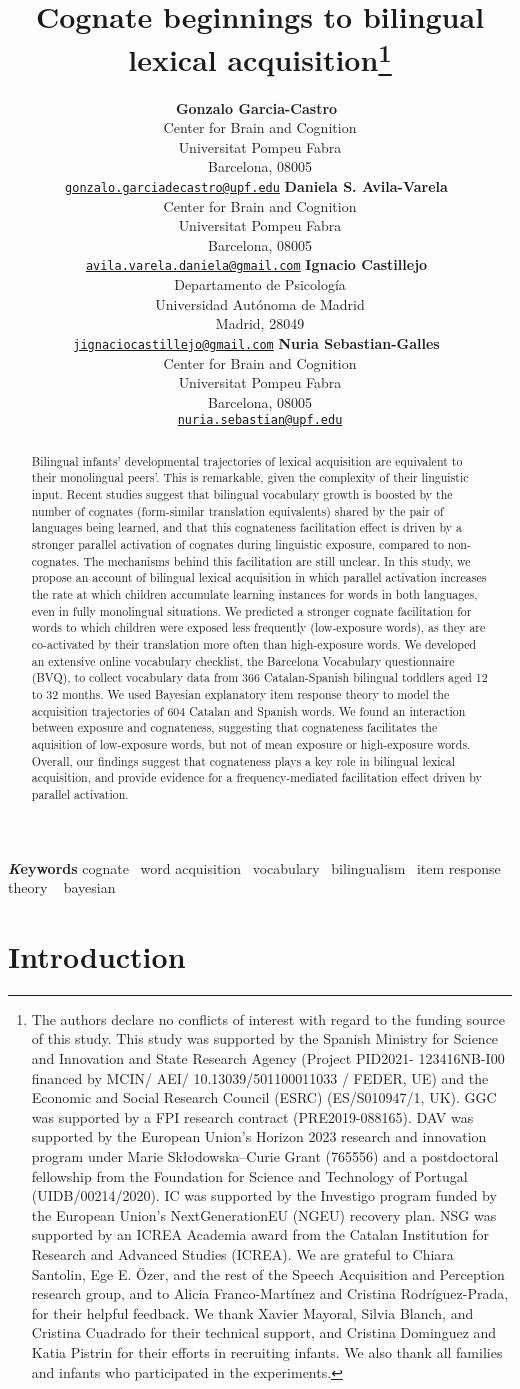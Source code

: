 \documentclass[
]{article}
\title{Cognate beginnings to bilingual lexical acquisition\thanks{The
authors declare no conflicts of interest with regard to the funding
source of this study. This study was supported by the Spanish Ministry
for Science and Innovation and State Research Agency (Project PID2021-
123416NB-I00 financed by MCIN/ AEI/ 10.13039/501100011033 / FEDER, UE)
and the Economic and Social Research Council (ESRC) (ES/S010947/1, UK).
GGC was supported by a FPI research contract (PRE2019-088165). DAV was
supported by the European Union's Horizon 2023 research and innovation
program under Marie Skłodowska--Curie Grant (765556) and a postdoctoral
fellowship from the Foundation for Science and Technology of Portugal
(UIDB/00214/2020). IC was supported by the Investigo program funded by
the European Union's NextGenerationEU (NGEU) recovery plan. NSG was
supported by an ICREA Academia award from the Catalan Institution for
Research and Advanced Studies (ICREA). We are grateful to Chiara
Santolin, Ege E. Özer, and the rest of the Speech Acquisition and
Perception research group, and to Alicia Franco-Martínez and Cristina
Rodríguez-Prada, for their helpful feedback. We thank Xavier Mayoral,
Silvia Blanch, and Cristina Cuadrado for their technical support, and
Cristina Dominguez and Katia Pistrin for their efforts in recruiting
infants. We also thank all families and infants who participated in the
experiments.}}
\author{
\textbf{Gonzalo Garcia-Castro}~\orcidlink{0000-0002-8553-4209}\\Center
for Brain and Cognition\\Universitat Pompeu Fabra\\Barcelona,
08005\\\texttt{\href{mailto:gonzalo.garciadecastro@upf.edu}{gonzalo.garciadecastro@upf.edu}}\And
\textbf{Daniela S. Avila-Varela}~\orcidlink{0000-0002-3518-8117}\\Center
for Brain and Cognition\\Universitat Pompeu Fabra\\Barcelona,
08005\\\texttt{\href{mailto:avila.varela.daniela@gmail.com}{avila.varela.daniela@gmail.com}}\And
\textbf{Ignacio
Castillejo}~\orcidlink{0000-0001-7445-0416}\\Departamento de
Psicología\\Universidad Autónoma de Madrid\\Madrid,
28049\\\texttt{\href{mailto:jignaciocastillejo@gmail.com}{jignaciocastillejo@gmail.com}}\And
\textbf{Nuria Sebastian-Galles}~\orcidlink{0000-0001-6938-2498}\\Center
for Brain and Cognition\\Universitat Pompeu Fabra\\Barcelona,
08005\\\texttt{\href{mailto:nuria.sebastian@upf.edu}{nuria.sebastian@upf.edu}}}
\date{}
\begin{document}
\maketitle
\begin{abstract}
Bilingual infants' developmental trajectories of lexical acquisition are
equivalent to their monolingual peers'. This is remarkable, given the
complexity of their linguistic input. Recent studies suggest that
bilingual vocabulary growth is boosted by the number of cognates
(form-similar translation equivalents) shared by the pair of languages
being learned, and that this cognateness facilitation effect is driven
by a stronger parallel activation of cognates during linguistic
exposure, compared to non-cognates. The mechanisms behind this
facilitation are still unclear. In this study, we propose an account of
bilingual lexical acquisition in which parallel activation increases the
rate at which children accumulate learning instances for words in both
languages, even in fully monolingual situations. We predicted a stronger
cognate facilitation for words to which children were exposed less
frequently (low-exposure words), as they are co-activated by their
translation more often than high-exposure words. We developed an
extensive online vocabulary checklist, the Barcelona Vocabulary
questionnaire (BVQ), to collect vocabulary data from 366 Catalan-Spanish
bilingual toddlers aged 12 to 32 months. We used Bayesian explanatory
item response theory to model the acquisition trajectories of 604
Catalan and Spanish words. We found an interaction between exposure and
cognateness, suggesting that cognateness facilitates the aquisition of
low-exposure words, but not of mean exposure or high-exposure words.
Overall, our findings suggest that cognateness plays a key role in
bilingual lexical acquisition, and provide evidence for a
frequency-mediated facilitation effect driven by parallel activation.
\end{abstract}
{\bfseries \emph Keywords}
\def\sep{\textbullet\ }
cognate \sep word
acquisition \sep vocabulary \sep bilingualism \sep item response
theory \sep 
bayesian

\ifdefined\Shaded\renewenvironment{Shaded}{\begin{tcolorbox}[sharp corners, breakable, frame hidden, boxrule=0pt, interior hidden, borderline west={3pt}{0pt}{shadecolor}, enhanced]}{\end{tcolorbox}}\fi

\hypertarget{introduction}{%
\section{Introduction}\label{introduction}}
\end{document}
